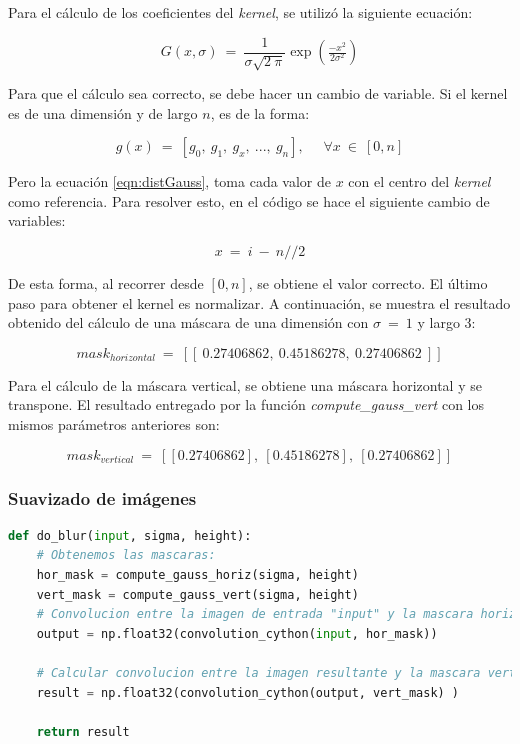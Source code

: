 \documentclass[12pt, letterpaper]{article}
\begin{document}
\par Para el cálculo de los coeficientes del \textit{kernel}, se utilizó la siguiente ecuación:

\begin{equation}
  G(x,\sigma) \: = \: \frac{1}{\sigma \sqrt{2 \: \pi}} \exp(\tfrac{-x^2}{2 \sigma^2})
  \label{eqn:distGauss}
\end{equation}

\par Para que el cálculo sea correcto, se debe hacer un cambio de variable. Si el kernel es de una dimensión y de largo $n$, es de la forma:

\begin{equation}
  g(x) \: = \: [g_0,\: g_1,\:g_x,\: ...,\: g_n] , \: \: \: \: \: \:  \forall x \: \in \: [0,n]
\end{equation}

Pero la ecuación \ref{eqn:distGauss}, toma cada valor de $x$ con el centro del \textit{kernel} como referencia. Para resolver esto, en el código se hace el siguiente cambio de variables:

\begin{equation}
  x \: = \: i \: - \: n//2
\end{equation}

De esta forma, al recorrer desde $[0,n]$, se obtiene el valor correcto. El último paso para obtener el kernel es normalizar. A continuación, se muestra el resultado obtenido del cálculo de una máscara de una dimensión con $\sigma \: = \: 1$ y largo 3:


\begin{equation*}
  mask_{horizontal} \: = \: [[\: 0.27406862 ,\: 0.45186278 ,\: 0.27406862 \:]]
\end{equation*}

\par Para el cálculo de la máscara vertical, se obtiene una máscara horizontal y se transpone. El resultado entregado por la función \textit{compute\_gauss\_vert} con los mismos parámetros anteriores son:

\begin{equation*}
  mask_{vertical} \: = \: [[0.27406862],\: [0.45186278],\: [0.27406862]]
\end{equation*}

\subsubsection{Suavizado de imágenes}
\begin{lstlisting}[language=Python, label = blurCode, caption=Suavizado de imágenes.]
def do_blur(input, sigma, height):
	# Obtenemos las mascaras:
	hor_mask = compute_gauss_horiz(sigma, height)
	vert_mask = compute_gauss_vert(sigma, height)
	# Convolucion entre la imagen de entrada "input" y la mascara horizontal
	output = np.float32(convolution_cython(input, hor_mask))

	# Calcular convolucion entre la imagen resultante y la mascara vertical
	result = np.float32(convolution_cython(output, vert_mask) )

	return result
\end{lstlisting}
\end{document}
